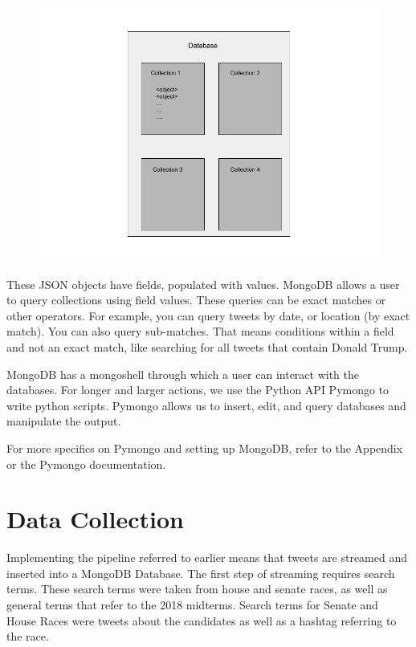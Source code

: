 \documentclass[11pt, twoside, reqno]{book}
\begin{document}
\begin{figure}[h]
	\includegraphics[scale=0.5]{database}
\end{figure}

These JSON objects have fields, populated with values. MongoDB allows a user to query collections using field values. These queries can be exact matches or other operators. For example, you can query tweets by date, or location (by exact match). You can also query sub-matches. That means conditions within a field and not an exact match, like searching for all tweets that contain Donald Trump.

MongoDB has a mongoshell through which a user can interact with the databases. For longer and larger actions, we use the Python API Pymongo to write python scripts. Pymongo allows us to insert, edit, and query databases and manipulate the output. 

For more specifics on Pymongo and setting up MongoDB, refer to the Appendix or the Pymongo documentation.

\section{Data Collection}
\hspace{0.2in} 
Implementing the pipeline referred to earlier means that tweets are streamed and inserted into a MongoDB Database. The first step of streaming requires search terms. These search terms were taken from house and senate races, as well as general terms that refer to the 2018 midterms. Search terms for Senate and House Races were tweets about the candidates as well as a hashtag referring to the race. 
\end{document}
